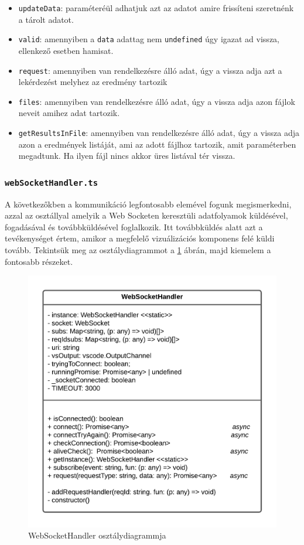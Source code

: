 \begin{itemize}
    \item \lstinline{updateData}: paraméteréül adhatjuk azt az adatot amire frissíteni szeretnénk a tárolt adatot.
    
    \item \lstinline{valid}: amennyiben a \lstinline{data} adattag nem \lstinline{undefined} úgy igazat ad vissza, ellenkező esetben hamisat. 
    
    \item \lstinline{request}: amennyiben van rendelkezésre álló adat, úgy a vissza adja azt a lekérdezést melyhez az eredmény tartozik
    
    \item \lstinline{files}: amennyiben van rendelkezésre álló adat, úgy a vissza adja azon fájlok neveit amihez adat tartozik.
    
    \item \lstinline{getResultsInFile}: amennyiben van rendelkezésre álló adat, úgy a vissza adja azon a eredmények listáját, ami az adott fájlhoz tartozik, amit paraméterben megadtunk. Ha ilyen fájl nincs akkor üres listával tér vissza.
    
    
\end{itemize}


\subsubsection{\lstinline{webSocketHandler.ts}}
A következőkben a kommunikáció legfontosabb elemével fogunk megismerkedni, azzal az osztállyal amelyik a Web Socketen keresztüli adatfolyamok küldésével, fogadásával és továbbküldésével foglalkozik. Itt továbbküldés alatt azt a tevékenységet értem, amikor a megfelelő vizuálizációs komponens felé küldi tovább. Tekintsük meg az osztálydiagrammot a \ref{fig:wsDiagram} ábrán, majd kiemelem a fontosabb részeket.

\begin{figure}[H]
  \centering
  \includegraphics[width=0.8\linewidth]{images/wsDiagram.png}
  \caption{WebSocketHandler osztálydiagrammja}
  \label{fig:wsDiagram}
\end{figure}

